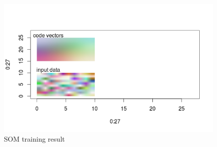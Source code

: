 \documentclass{scrartcl}
\begin{document}
\begin{figure}[H]
    \centering
\includegraphics[width=\textwidth]{img/2_3som_sub.png}
    \caption{SOM training result}
\end{figure}
\end{document}
